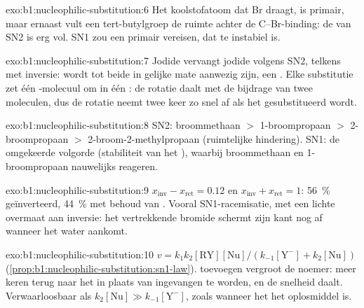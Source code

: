 \begin{solution}{exo:b1:nucleophilic-substitution:6}
Het koolstofatoom dat Br draagt, is primair, maar ernaast vult een
tert-butylgroep de ruimte achter de C--Br-binding: de 
van SN2 is erg vol. SN1 zou een primair  vereisen, dat te
instabiel is.
\end{solution}

\begin{solution}{exo:b1:nucleophilic-substitution:7}
Jodide vervangt jodide volgens SN2, telkens met inversie:  wordt
 tot beide in gelijke mate aanwezig zijn, een .
Elke substitutie zet één -molecuul om in één : de rotatie
daalt met de bijdrage van twee moleculen, dus de rotatie neemt twee keer
zo snel af als het  gesubstitueerd wordt.
\end{solution}

\begin{solution}{exo:b1:nucleophilic-substitution:8}
SN2: broommethaan $>$ 1-broompropaan $>$ 2-broompropaan $>$
2-broom-2-methylpropaan (ruimtelijke hindering). SN1: de omgekeerde
volgorde (stabiliteit van het ), waarbij broommethaan en
1-broompropaan nauwelijks reageren.
\end{solution}

\begin{solution}{exo:b1:nucleophilic-substitution:9}
$x_{\text{inv}} - x_{\text{ret}} = 0.12$ en $x_{\text{inv}} + x_{\text{ret}} = 1$:
\qty{56}{\percent} geïnverteerd, \qty{44}{\percent} met behoud van
. Vooral SN1-racemisatie, met een lichte overmaat aan
inversie: het vertrekkende bromide schermt zijn kant nog af wanneer het
water aankomt.
\end{solution}

\begin{solution}{exo:b1:nucleophilic-substitution:10}
$v = k_1k_2[\mathrm{RY}][\mathrm{Nu}]/(k_{-1}[\mathrm{Y^-}] + k_2[\mathrm{Nu}])$
(\cref{prop:b1:nucleophilic-substitution:sn1-law}).  toevoegen
vergroot de noemer: meer  keren terug naar het  in
plaats van ingevangen te worden, en de snelheid daalt. Verwaarloosbaar als
$k_2[\mathrm{Nu}] \gg k_{-1}[\mathrm{Y^-}]$, zoals wanneer het 
het oplosmiddel is.
\end{solution}

